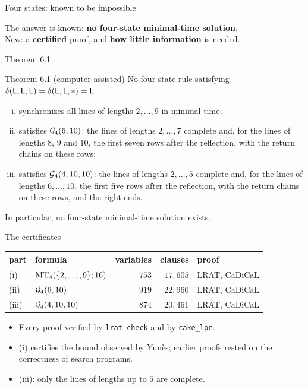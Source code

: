 
\begin{frame}{Four states: known to be impossible}
\vspace{5ex}
\begin{center}\Large
The answer is known: \textbf{no four-state minimal-time solution}.\\[3ex]
\large New: a \textbf{certified} proof, and \textbf{how little information} is needed.
\end{center}
\end{frame}

\begin{frame}{Theorem 6.1}
\begin{statement}{Theorem 6.1 (computer-assisted)}
No four-state rule satisfying $\delta(\mathsf L,\mathsf L,\mathsf L)=\delta(\mathsf L,\mathsf L,\ast)=\mathsf L$
\begin{enumerate}[(i)]
\item synchronizes all lines of lengths $2,\dots,9$ in minimal time;
\item satisfies $\mathcal G_4(6,10)$: the lines of lengths $2,\dots,7$ complete and, for the lines of lengths $8$, $9$ and $10$, the first seven rows after the reflection, with the return chains on these rows;
\item satisfies $\mathcal G_4(4,10,10)$: the lines of lengths $2,\dots,5$ complete and, for the lines of lengths $6,\dots,10$, the first five rows after the reflection, with the return chains on these rows, and the right ends.
\end{enumerate}
In particular, no four-state minimal-time solution exists.
\end{statement}
\end{frame}

\begin{frame}{The certificates}
\renewcommand{\arraystretch}{1.3}
\begin{center}
\begin{tabular}{@{}llrrl@{}}
\toprule
part & formula & variables & clauses & proof\\
\midrule
(i) & $\mathrm{MT}_4(\{2,\dots,9\};16)$ & $753$ & $17{,}605$ & LRAT, CaDiCaL\\
(ii) & $\mathcal G_4(6,10)$ & $919$ & $22{,}960$ & LRAT, CaDiCaL\\
(iii) & $\mathcal G_4(4,10,10)$ & $874$ & $20{,}461$ & LRAT, CaDiCaL\\
\bottomrule
\end{tabular}
\end{center}
\vspace{1ex}
\begin{itemize}
\item Every proof verified by \texttt{lrat-check} and by \texttt{cake\_lpr}. 
\item (i) certifies the bound observed by Yun\`es; earlier proofs rested on the correctness of search programs.
\item (iii): only the lines of lengths up to $5$ are complete.
\end{itemize}
\end{frame}

